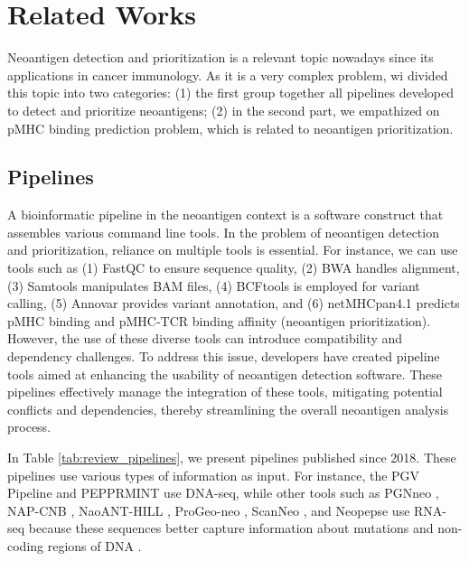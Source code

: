 \section{Related Works}

Neoantigen detection and prioritization is a relevant topic nowadays since its applications in cancer immunology. As it is a very complex problem, wi divided this topic into two categories: (1) the first group together all pipelines developed to detect and prioritize neoantigens; (2) in the second part, we empathized  on pMHC binding prediction problem, which is related to neoantigen prioritization.  

\subsection{Pipelines}

A bioinformatic pipeline in the neoantigen context is a software construct that assembles various command line tools. In the problem of neoantigen detection and prioritization, reliance on multiple tools is essential. For instance, we can use tools such as (1) FastQC to ensure sequence quality, (2) BWA handles alignment, (3) Samtools manipulates BAM files, (4) BCFtools is employed for variant calling, (5) Annovar provides variant annotation, and (6) netMHCpan4.1 predicts pMHC binding and pMHC-TCR binding affinity (neoantigen prioritization). However, the use of these diverse tools can introduce compatibility and dependency challenges. To address this issue, developers have created pipeline tools aimed at enhancing the usability of neoantigen detection software. These pipelines effectively manage the integration of these tools, mitigating potential conflicts and dependencies, thereby streamlining the overall neoantigen analysis process.


In Table \ref{tab:review_pipelines}, we present pipelines published since 2018. These pipelines use various types of information as input. For instance, the PGV Pipeline \cite{rubinsteyn2018computational} and PEPPRMINT \cite{zhou2023prioritizing} use DNA-seq, while other tools such as PGNneo \cite{tan2023pgnneo}, NAP-CNB \cite{wert2021predicting}, NaoANT-HILL \cite{coelho2020neoant}, ProGeo-neo \cite{li2020progeo}, ScanNeo \cite{wang2019scanneo}, and Neopepse \cite{kim2018neopepsee} use RNA-seq because these sequences better capture information about mutations and non-coding regions of DNA \cite{tan2023pgnneo}.

